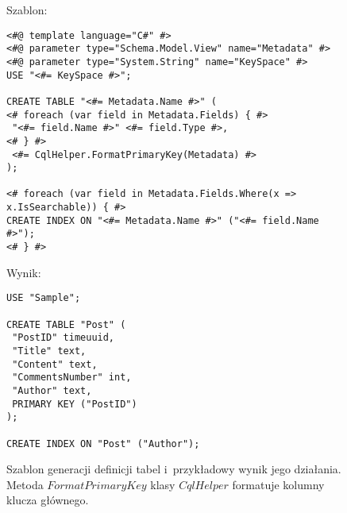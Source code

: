 \begin{figure}[!ht]
Szablon:

\begin{verbatim}
<#@ template language="C#" #>
<#@ parameter type="Schema.Model.View" name="Metadata" #>
<#@ parameter type="System.String" name="KeySpace" #>
USE "<#= KeySpace #>";

CREATE TABLE "<#= Metadata.Name #>" (
<# foreach (var field in Metadata.Fields) { #>
 "<#= field.Name #>" <#= field.Type #>,
<# } #>
 <#= CqlHelper.FormatPrimaryKey(Metadata) #>
);

<# foreach (var field in Metadata.Fields.Where(x => x.IsSearchable)) { #>
CREATE INDEX ON "<#= Metadata.Name #>" ("<#= field.Name #>");
<# } #>
\end{verbatim}

Wynik:

\begin{verbatim}
USE "Sample";

CREATE TABLE "Post" (
 "PostID" timeuuid,
 "Title" text,
 "Content" text,
 "CommentsNumber" int,
 "Author" text,
 PRIMARY KEY ("PostID")
);

CREATE INDEX ON "Post" ("Author");
\end{verbatim}

\caption{
 Szablon generacji definicji tabel i~przykładowy wynik jego działania.
 Metoda $FormatPrimaryKey$ klasy $CqlHelper$ formatuje kolumny klucza głównego.
}
\label{fig:single:template_table}
\end{figure}
